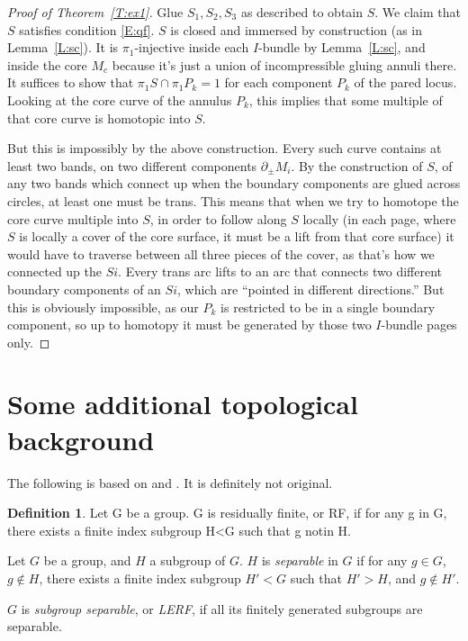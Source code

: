 \documentclass[12pt]{amsart}
\theoremstyle{definition}
\newtheorem{defn}[theorem]{Definition}
\theoremstyle{remark}
\newcommand{\bd}{\partial}
\begin{document}
\begin{proof}[Proof of Theorem~\ref{T:ex1}]
Glue $S_1,S_2,S_3$ as described to obtain $S$. We claim that $S$ satisfies
condition \eqref{E:qf}. $S$ is closed and immersed by construction (as in
Lemma~\ref{L:sc}). It is $\pi_1$-injective inside each $I$-bundle by
Lemma~\ref{L:sc}, and inside the core $M_c$ because it's just a union of
incompressible gluing annuli there. It suffices to show that $\pi_1S \cap
\pi_1P_k = 1$ for each component $P_k$ of the pared locus. Looking at the core
curve of the annulus $P_k$, this implies that some multiple of that core curve
is homotopic into $S$.

But this is impossibly by the above construction. Every such curve contains at
least two bands, on two different components $\bd_\pm M_i$. By the construction
of $S$, of any two bands which connect up when the boundary components are
glued across circles, at least one must be trans. This means that when we try
to homotope the core curve multiple into $S$, in order to follow along $S$
locally (in each page, where $S$ is locally a cover of the core surface, it
must be a lift from that core surface) it would have to traverse between all
three pieces of the cover, as that's how we connected up the $Si$. Every trans
arc lifts to an arc that connects two different boundary components of an $Si$,
which are ``pointed in different directions.'' But this is obviously
impossible, as our $P_k$ is restricted to be in a single boundary component, so
up to homotopy it must be generated by those two $I$-bundle pages only.

\end{proof}

\section{Some additional topological background}

The following is based on \cite{AFW} and \cite{LR}. It is definitely not
original.

\begin{defn}

Let G be a group. G is residually finite, or RF, if for any g in G, there
exists a finite index subgroup H<G such that g notin H.

Let $G$ be a group, and $H$ a subgroup of $G$. $H$ is \emph{separable} in $G$
if for any $g \in G$, $g \notin H$, there exists a finite index subgroup $H'<G$
such that $H'>H$, and $g \notin H'$.

$G$ is \emph{subgroup separable}, or \emph{LERF}, if all its finitely generated
subgroups are separable.

\end{defn}
\end{document}
